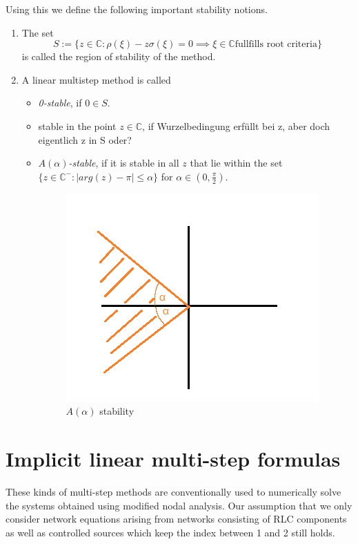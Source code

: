 	Using this we define the following important stability notions.
	\begin{definition}
		\begin{enumerate}
			\item 
			The set
			\begin{equation}
				S := \{z \in \mathbb{C} : \rho(\xi) - z \sigma(\xi) = 0 \implies \xi \in \mathbb{C} \text{fullfills root criteria}\}
			\end{equation}
			is called the region of stability of the method.
			\item 
			A linear multistep method is called
			\begin{itemize}
				\item \emph{0-stable}, if $0 \in S$.
				\item stable in the point $z \in \mathbb{C}$, if Wurzelbedingung erfüllt bei z, aber doch eigentlich z in S oder?
				\item \emph{$A(\alpha)$-stable}, if it is stable in all $z$ that lie within the set $\{z \in \mathbb{C}^- : |arg(z)-\pi| \leq \alpha\}$ for $\alpha \in (0, \frac{\pi}{2})$.
				 \begin{figure}[H]
				 	\centering
				 	\includegraphics[width=0.3\linewidth]{screenshot021}
				 	\caption{$A(\alpha)$ stability}
				 	\label{fig:screenshot021}
				 \end{figure}
				 
			\end{itemize}
		\end{enumerate}
	\end{definition}
	

\section{Implicit linear multi-step formulas}
These kinds of multi-step methods are conventionally used to numerically solve the systems obtained using modified nodal analysis. Our assumption that we only consider network equations arising from networks consisting of RLC components as well as controlled sources which keep the index between 1 and 2 still holds.

